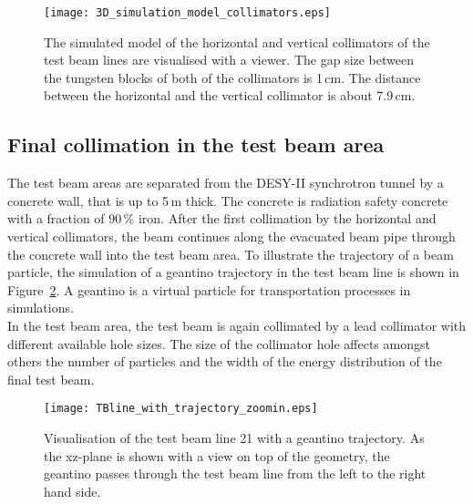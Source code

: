 \begin{figure}[htbp]
  \centering
  \texttt{[image: 3D\_simulation\_model\_collimators.eps]}
  \caption[3D simulation model of the horizontal and vertical collimators of the test beam lines.]{The simulated model of the horizontal and vertical collimators of the test beam lines are visualised with a \vrml viewer. The gap size between the tungsten blocks of both of the collimators is 1\,cm. The distance between the horizontal and the vertical collimator is about 7.9\,cm.}
    \label{fig:3D_model_collimators}
\end{figure}

\subsection{Final collimation in the test beam area}

The test beam areas are separated from the DESY-II synchrotron tunnel by a 
concrete wall, that is up to 5\,m thick. The concrete is radiation safety 
concrete with a fraction of 90\,\% iron. After the first collimation by the 
horizontal and vertical collimators, the beam continues along the evacuated beam 
pipe through the concrete wall into the test beam area. 
To illustrate the trajectory of a beam particle, the simulation of a geantino 
trajectory in the test beam line is shown in Figure~\ref{fig:TBline_trajectory}. 
A geantino is a virtual particle for transportation processes in \geant 
simulations.~\cite{Geantino}
\\In the test beam area, the test beam is again collimated by a lead collimator 
with different available hole sizes. The size of the collimator hole affects 
amongst others the number of particles and the width of the energy distribution 
of the final test beam.

\begin{figure}[htbp]
  \centering
  \texttt{[image: TBline\_with\_trajectory\_zoomin.eps]}
  \caption[Visualisation of a geantino trajectory in the test beam line 21.]{Visualisation of the test beam line 21 with a geantino trajectory. As the xz-plane is shown with a view on top of the geometry, the geantino passes through the test beam line from the left to the right hand side.}
    \label{fig:TBline_trajectory}
\end{figure}


